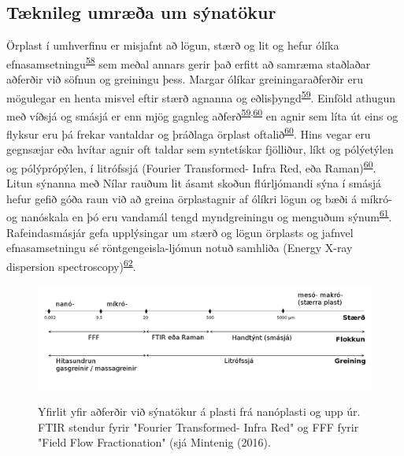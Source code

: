\documentclass[icelandic,]{book}
\begin{document}
\hypertarget{tknileg-umra-um-synatokur}{%
\subsection*{Tæknileg umræða um sýnatökur}\label{tknileg-umra-um-synatokur}}

Örplast í umhverfinu er misjafnt að lögun, stærð og lit og hefur ólíka efnasamsetningu\textsuperscript{\protect\hyperlink{ref-phuong2016there}{58}} sem meðal annars gerir það erfitt að samræma staðlaðar aðferðir við söfnun og greiningu þess.
Margar ólíkar greiningaraðferðir eru mögulegar en henta misvel eftir stærð agnanna og eðlisþyngd\textsuperscript{\protect\hyperlink{ref-hepso2018experimental}{59}}. Einföld athugun með víðsjá og smásjá er enn mjög gagnleg aðferð\textsuperscript{\protect\hyperlink{ref-hepso2018experimental}{59},\protect\hyperlink{ref-SONG2015202}{60}} en agnir sem líta út eins og flyksur eru þá frekar vantaldar og þráðlaga örplast oftalið\textsuperscript{\protect\hyperlink{ref-SONG2015202}{60}}. Hins vegar eru gegnsæjar eða hvítar agnir oft taldar sem syntetískar fjölliður, líkt og pólýetýlen og pólýprópýlen, í litrófssjá (Fourier Transformed- Infra Red, eða Raman)\textsuperscript{\protect\hyperlink{ref-SONG2015202}{60}}. Litun sýnanna með Nílar rauðum lit ásamt skoðun flúrljómandi sýna í smásjá hefur gefið góða raun við að greina örplastagnir af ólíkri lögun og bæði á míkró- og nanóskala en þó eru vandamál tengd myndgreiningu og menguðum sýnum\textsuperscript{\protect\hyperlink{ref-SHIM2016469}{61}}. Rafeindasmásjár gefa upplýsingar um stærð og lögun örplasts og jafnvel efnasamsetningu sé röntgengeisla-ljómun notuð samhliða (Energy X-ray dispersion spectroscopy)\textsuperscript{\protect\hyperlink{ref-bitam2014bio2}{62}}.

\begin{figure}[H]
{\centering \includegraphics[width=1\linewidth]{myndir/synataka}}
\caption{Yfirlit yfir aðferðir við sýnatökur á plasti frá nanóplasti og upp úr. FTIR stendur fyrir "Fourier Transformed- Infra Red" og FFF fyrir "Field Flow Fractionation" (sjá Mintenig (2016).}\label{fig:FTIR}
\end{figure}
\end{document}
